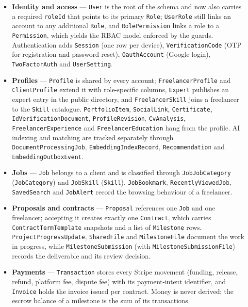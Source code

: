 \begin{itemize}[leftmargin=*]\sloppy
    \item \textbf{Identity and access} --- \texttt{User} is the root of the schema and now also carries a required \texttt{roleId} that points to its primary \texttt{Role}; \texttt{UserRole} still links an account to any additional \texttt{Role}, and \texttt{RolePermission} links a role to a \texttt{Permission}, which yields the RBAC model enforced by the guards. Authentication adds \texttt{Session} (one row per device), \texttt{VerificationCode} (OTP for registration and password reset), \texttt{OauthAccount} (Google login), \texttt{TwoFactorAuth} and \texttt{UserSetting}.
    \item \textbf{Profiles} --- \texttt{Profile} is shared by every account; \texttt{FreelancerProfile} and \texttt{ClientProfile} extend it with role-specific columns, \texttt{Expert} publishes an expert entry in the public directory, and \texttt{FreelancerSkill} joins a freelancer to the \texttt{Skill} catalogue. \texttt{PortfolioItem}, \texttt{SocialLink}, \texttt{Certificate}, \texttt{IdVerificationDocument}, \texttt{ProfileRevision}, \texttt{CvAnalysis}, \texttt{FreelancerExperience} and \texttt{FreelancerEducation} hang from the profile. AI indexing and matching are tracked separately through \texttt{DocumentProcessingJob}, \texttt{EmbeddingIndexRecord}, \texttt{Recommendation} and \texttt{EmbeddingOutboxEvent}.
    \item \textbf{Jobs} --- \texttt{Job} belongs to a client and is classified through \texttt{JobJobCategory} (\texttt{JobCategory}) and \texttt{JobSkill} (\texttt{Skill}). \texttt{JobBookmark}, \texttt{RecentlyViewedJob}, \texttt{SavedSearch} and \texttt{JobAlert} record the browsing behaviour of a freelancer.
    \item \textbf{Proposals and contracts} --- \texttt{Proposal} references one \texttt{Job} and one freelancer; accepting it creates exactly one \texttt{Contract}, which carries \texttt{ContractTermTemplate} snapshots and a list of \texttt{Milestone} rows. \texttt{ProjectProgressUpdate}, \texttt{SharedFile} and \texttt{MilestoneFile} document the work in progress, while \texttt{MilestoneSubmission} (with \texttt{MilestoneSubmissionFile}) records the deliverable and its review decision.
    \item \textbf{Payments} --- \texttt{Transaction} stores every Stripe movement (funding, release, refund, platform fee, dispute fee) with its payment-intent identifier, and \texttt{Invoice} holds the invoice issued per contract. Money is never derived: the escrow balance of a milestone is the sum of its transactions.

\end{itemize}
